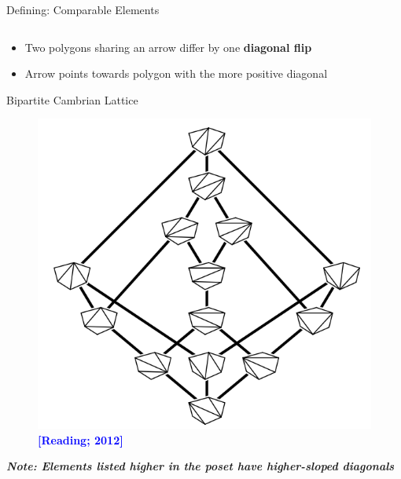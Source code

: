 \documentclass[xcolor=x11names,compress,t]{beamer}
\begin{document}
\begin{frame}{Defining: Comparable Elements}
\begin{columns}
\begin{column}{0.4\textwidth}
\begin{tikzpicture}[xscale=1.0, yscale = .7]
        \end{tikzpicture}
    \end{column}
    \end{columns}
    \vspace{0.8cm}
    \begin{itemize}
        \item Two polygons sharing an arrow differ by one \textbf{diagonal flip}
        \item Arrow points towards polygon with the more positive diagonal
    \end{itemize}
\end{frame}

\begin{frame}{Bipartite Cambrian Lattice}
        \begin{figure}
        \centering
            \includegraphics[scale = .6]{ExCambrianLattice.png}
        \caption*{\textcolor{blue}{\textbf{[Reading; 2012]}}}
        \end{figure}
    
    \emph{\textbf{Note: Elements listed higher in the poset have higher-sloped diagonals}}
    
\end{frame}
\end{document}
